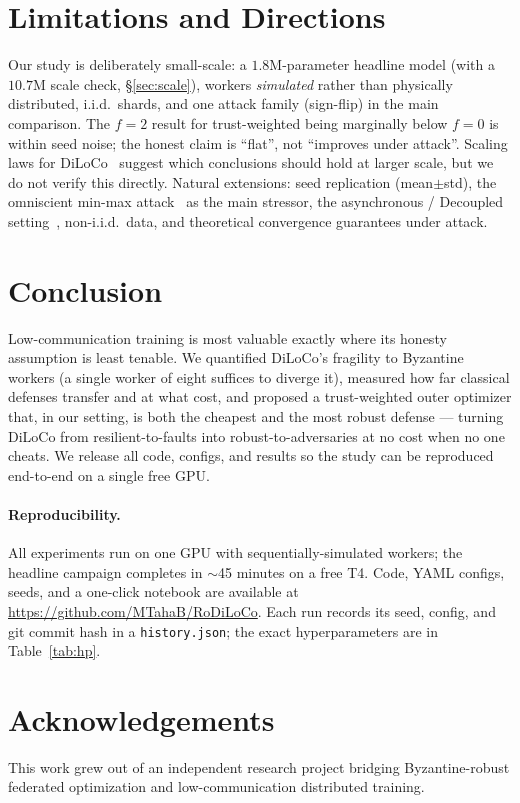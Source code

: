 \documentclass[11pt]{article}
\begin{document}
\section{Limitations and Directions}
\label{sec:limitations}
Our study is deliberately small-scale: a $1.8$M-parameter headline model (with a $10.7$M
scale check, \S\ref{sec:scale}), workers \emph{simulated} rather than physically distributed,
i.i.d.\ shards, and one attack family (sign-flip) in the main comparison. The $f{=}2$ result for trust-weighted
being marginally below $f{=}0$ is within seed noise; the honest claim is ``flat'', not
``improves under attack''. Scaling laws for DiLoCo~\citep{dilocoscaling2025} suggest which
conclusions should hold at larger scale, but we do not verify this directly. Natural
extensions: seed replication (mean$\pm$std), the omniscient min-max attack~\citep{minmax2021}
as the main stressor, the asynchronous / Decoupled setting~\citep{decoupleddiloco2026},
non-i.i.d.\ data, and theoretical convergence guarantees under attack.

\section{Conclusion}
Low-communication training is most valuable exactly where its honesty assumption is least
tenable. We quantified DiLoCo's fragility to Byzantine workers (a single worker of eight
suffices to diverge it), measured how far classical defenses transfer and at what cost, and
proposed a trust-weighted outer optimizer that, in our setting, is both the cheapest and the
most robust defense --- turning DiLoCo from resilient-to-faults into robust-to-adversaries at
no cost when no one cheats. We release all code, configs, and results so the study can be
reproduced end-to-end on a single free GPU.

\paragraph{Reproducibility.} All experiments run on one GPU with sequentially-simulated
workers; the headline campaign completes in $\sim$45 minutes on a free T4. Code, YAML configs,
seeds, and a one-click notebook are available at \url{https://github.com/MTahaB/RoDiLoCo}.
Each run records its seed, config, and git commit hash in a \texttt{history.json}; the exact
hyperparameters are in Table~\ref{tab:hp}.

\section*{Acknowledgements}
This work grew out of an independent research project bridging Byzantine-robust federated
optimization and low-communication distributed training.



\end{document}
